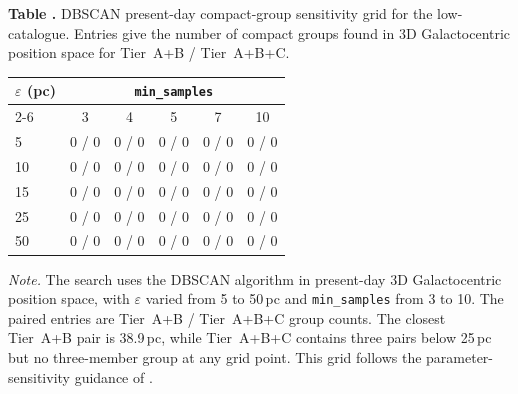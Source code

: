\begin{center}
\label{tab:cluster_search}
\begin{minipage}{\columnwidth}
\small\textbf{Table \thetable.} DBSCAN present-day compact-group sensitivity grid for the low-\vgrf{} catalogue.  Entries give the number of compact groups found in 3D Galactocentric position space for Tier~A+B / Tier~A+B+C.
\end{minipage}
\vspace{0.4ex}

\scriptsize
\setlength{\tabcolsep}{4pt}
\begin{tabular}{lccccc}
\hline\hline
$\varepsilon$ (pc) & \multicolumn{5}{c}{\texttt{min\_samples}} \\
\cline{2-6}
 & 3 & 4 & 5 & 7 & 10 \\
\hline
5  & 0 / 0 & 0 / 0 & 0 / 0 & 0 / 0 & 0 / 0 \\
10 & 0 / 0 & 0 / 0 & 0 / 0 & 0 / 0 & 0 / 0 \\
15 & 0 / 0 & 0 / 0 & 0 / 0 & 0 / 0 & 0 / 0 \\
25 & 0 / 0 & 0 / 0 & 0 / 0 & 0 / 0 & 0 / 0 \\
50 & 0 / 0 & 0 / 0 & 0 / 0 & 0 / 0 & 0 / 0 \\
\hline
\end{tabular}
\vspace{0.5ex}

\begin{minipage}{0.95\columnwidth}
\footnotesize
\textit{Note.} The search uses the \citet{Ester1996} DBSCAN algorithm in present-day 3D Galactocentric position space, with $\varepsilon$ varied from 5 to 50\,pc and \texttt{min\_samples} from 3 to 10.  The paired entries are Tier~A+B / Tier~A+B+C group counts.  The closest Tier~A+B pair is 38.9\,pc, while Tier~A+B+C contains three pairs below 25\,pc but no three-member group at any grid point.  This grid follows the parameter-sensitivity guidance of \citet{Schubert2017}.
\end{minipage}
\end{center}
